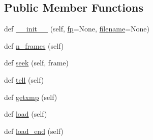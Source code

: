 \subsection*{Public Member Functions}
\begin{DoxyCompactItemize}
\item 
def \hyperlink{classPIL_1_1TiffImagePlugin_1_1TiffImageFile_a19141a455a2d93135ea995c2c662741b}{\+\_\+\+\_\+init\+\_\+\+\_\+} (self, \hyperlink{classPIL_1_1TiffImagePlugin_1_1TiffImageFile_a3945776f2dceba14e5c0430cf9e44a46}{fp}=None, \hyperlink{classPIL_1_1ImageFile_1_1ImageFile_a8c0859e3d3dc0631584f800d1daeaee7}{filename}=None)
\item 
def \hyperlink{classPIL_1_1TiffImagePlugin_1_1TiffImageFile_a6db188e66051cf6990b4059e3ad6c826}{n\+\_\+frames} (self)
\item 
def \hyperlink{classPIL_1_1TiffImagePlugin_1_1TiffImageFile_a3b2f701c0ab9cdf1218b21ae41db794f}{seek} (self, frame)
\item 
def \hyperlink{classPIL_1_1TiffImagePlugin_1_1TiffImageFile_a4d2003c38a15ac8f3e59e43372026d1a}{tell} (self)
\item 
def \hyperlink{classPIL_1_1TiffImagePlugin_1_1TiffImageFile_ab2f82427b8046d7cbb15574eb3d86703}{getxmp} (self)
\item 
def \hyperlink{classPIL_1_1TiffImagePlugin_1_1TiffImageFile_a3f82c5bac50552d4a77faed040906ce9}{load} (self)
\item 
def \hyperlink{classPIL_1_1TiffImagePlugin_1_1TiffImageFile_aff708af229f2e041e67ee170bf0ab5d8}{load\+\_\+end} (self)
\end{DoxyCompactItemize}
